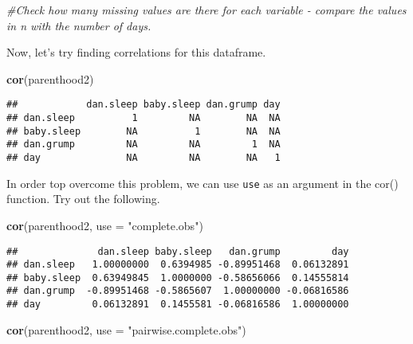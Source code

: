 \documentclass[
]{article}
\newenvironment{Shaded}{\begin{snugshade}}{\end{snugshade}}
\newcommand{\AttributeTok}[1]{\textcolor[rgb]{0.13,0.29,0.53}{#1}}
\newcommand{\CommentTok}[1]{\textcolor[rgb]{0.56,0.35,0.01}{\textit{#1}}}
\newcommand{\FunctionTok}[1]{\textcolor[rgb]{0.13,0.29,0.53}{\textbf{#1}}}
\newcommand{\NormalTok}[1]{#1}
\newcommand{\StringTok}[1]{\textcolor[rgb]{0.31,0.60,0.02}{#1}}
\begin{document}
\begin{Shaded}
\begin{Highlighting}[]
\CommentTok{\#Check how many missing values are there for each variable {-} compare the values in \textquotesingle{}n\textquotesingle{} with the number of days.}
\end{Highlighting}
\end{Shaded}

Now, let's try finding correlations for this dataframe.

\begin{Shaded}
\begin{Highlighting}[]
\FunctionTok{cor}\NormalTok{(parenthood2)}
\end{Highlighting}
\end{Shaded}

\begin{verbatim}
##            dan.sleep baby.sleep dan.grump day
## dan.sleep          1         NA        NA  NA
## baby.sleep        NA          1        NA  NA
## dan.grump         NA         NA         1  NA
## day               NA         NA        NA   1
\end{verbatim}

In order top overcome this problem, we can use \texttt{use} as an
argument in the cor() function. Try out the following.

\begin{Shaded}
\begin{Highlighting}[]
\FunctionTok{cor}\NormalTok{(parenthood2, }\AttributeTok{use =} \StringTok{"complete.obs"}\NormalTok{)}
\end{Highlighting}
\end{Shaded}

\begin{verbatim}
##              dan.sleep baby.sleep   dan.grump         day
## dan.sleep   1.00000000  0.6394985 -0.89951468  0.06132891
## baby.sleep  0.63949845  1.0000000 -0.58656066  0.14555814
## dan.grump  -0.89951468 -0.5865607  1.00000000 -0.06816586
## day         0.06132891  0.1455581 -0.06816586  1.00000000
\end{verbatim}

\begin{Shaded}
\begin{Highlighting}[]
\FunctionTok{cor}\NormalTok{(parenthood2, }\AttributeTok{use =} \StringTok{"pairwise.complete.obs"}\NormalTok{)}
\end{Highlighting}
\end{Shaded}
\end{document}
